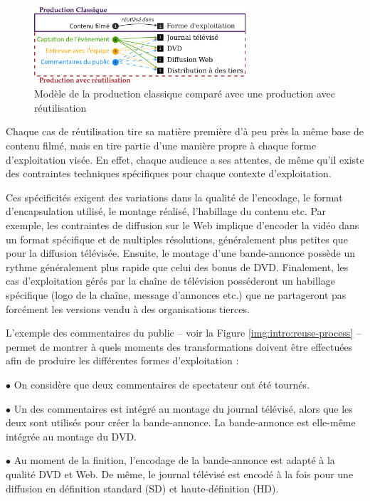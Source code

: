 \begin{figure}[ht!]
\centering
\includegraphics[width=0.7\textwidth]{images/UC-Tahnhauser-v1fr.png}
\caption{Modèle de la production classique comparé avec une production avec réutilisation}
\label{img:intro:reuse}
\end{figure}

Chaque cas de réutilisation tire sa matière première d'à peu près la même base de contenu filmé, mais en tire partie d'une manière propre à chaque forme d'exploitation visée. 
En effet, chaque audience a ses attentes, de même qu'il existe des contraintes techniques spécifiques pour chaque contexte d'exploitation. 

Ces spécificités exigent des variations dans la qualité de l'encodage, le format d'encapsulation utilisé, le montage réalisé, l'habillage du contenu etc. 
Par exemple, les contraintes de diffusion sur le Web implique d'encoder la vidéo dans un format spécifique et de multiples résolutions, généralement plus petites que pour la diffusion télévisée. 
Ensuite, le montage d'une bande-annonce possède un rythme généralement plus rapide que celui des bonus de DVD. 
Finalement, les cas d'exploitation gérés par la chaîne de télévision posséderont un habillage spécifique (logo de la chaîne, message d'annonces etc.) que ne partageront pas forcément les versions vendu à des organisations tierces. 

L'exemple des commentaires du public -- voir la Figure \ref{img:intro:reuse-process} -- permet de montrer à quels moments des transformations doivent être effectuées afin de produire les différentes formes d'exploitation :
\begin{liste} 
	\item[$\bullet$] On considère que deux commentaires de spectateur ont été tournés. 
	\item[$\bullet$] Un des commentaires est intégré au montage du journal télévisé, alors que les deux sont utilisés pour créer la bande-annonce. La bande-annonce est elle-même intégrée au montage du DVD. 
	\item[$\bullet$] Au moment de la finition, l'encodage de la bande-annonce est adapté à la qualité DVD et Web. De même, le journal télévisé est encodé à la fois pour une diffusion en définition standard (SD) et haute-définition (HD).
\end{liste}


